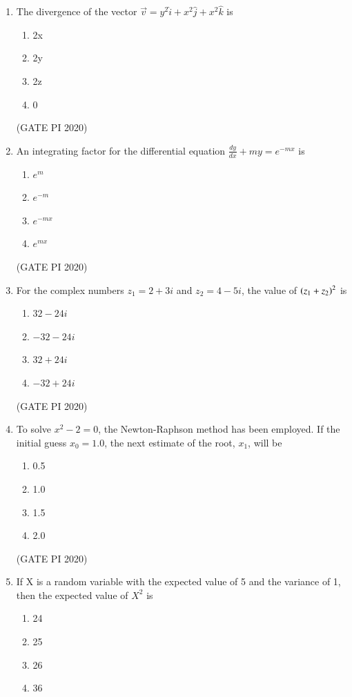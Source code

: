 \documentclass[journal,12pt,onecolumn]{IEEEtran}
\theoremstyle{remark}
\begin{document}
\begin{enumerate}
    
\item The divergence of the vector $\vec{v} = y^2 \hat{i} + x^2 \hat{j} + x^2 \hat{k}$ is 
\begin{enumerate}
    \item 2x
    \item 2y
    \item 2z
    \item 0
\end{enumerate}

\hfill (GATE PI 2020)

\item An integrating factor for the differential equation $\frac{dy}{dx} + my = e^{-mx}$ is 
\begin{enumerate}
    \item $e^m$
    \item $e^{-m}$
    \item $e^{-mx}$
    \item $e^{mx}$
\end{enumerate}

\hfill (GATE PI 2020)

\item For the complex numbers $z_1 = 2 + 3i$ and $z_2 = 4 - 5i$, the value of $\left(z_1 + z_2\right)^{2}$ is
\begin{enumerate}
    \item $32 - 24i$
    \item $-32 - 24i$
    \item $32 + 24i$
    \item $-32 + 24i$
\end{enumerate}

\hfill (GATE PI 2020)

\item To solve $x^{2} - 2 = 0$, the Newton-Raphson method has been employed. If the initial guess $x_0 = 1.0$, the next estimate of the root, $x_1$, will be
\begin{enumerate}
    \item 0.5
    \item 1.0
    \item 1.5
    \item 2.0
\end{enumerate}

\hfill (GATE PI 2020)

\item If X is a random variable with the expected value of 5 and the variance of 1, then the expected value of $X^2$ is
\begin{enumerate}
\item 24
\item 25
\item 26
\item 36
\end{enumerate}


\end{enumerate}
\end{document}

